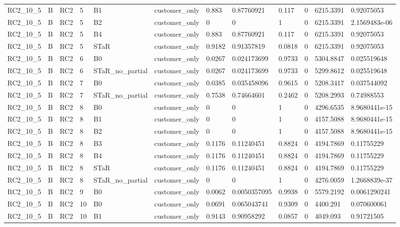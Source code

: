 \begin{longtable}{llllllllllll}
RC2\_10\_5 & B & RC2 & 5 & B1 & customer\_only & 0.883 & 0.87760921 & 0.117 & 0 & 6215.3391 & 0.92075053 \\
RC2\_10\_5 & B & RC2 & 5 & B2 & customer\_only & 0 & 0 & 1 & 0 & 6215.3391 & 2.1569483e-06 \\
RC2\_10\_5 & B & RC2 & 5 & B4 & customer\_only & 0.883 & 0.87760921 & 0.117 & 0 & 6215.3391 & 0.92075053 \\
RC2\_10\_5 & B & RC2 & 5 & STaR & customer\_only & 0.9182 & 0.91357819 & 0.0818 & 0 & 6215.3391 & 0.92075053 \\
RC2\_10\_5 & B & RC2 & 6 & B0 & customer\_only & 0.0267 & 0.024173699 & 0.9733 & 0 & 5304.8847 & 0.025519648 \\
RC2\_10\_5 & B & RC2 & 6 & STaR\_no\_partial & customer\_only & 0.0267 & 0.024173699 & 0.9733 & 0 & 5299.8612 & 0.025519648 \\
RC2\_10\_5 & B & RC2 & 7 & B0 & customer\_only & 0.0385 & 0.035458096 & 0.9615 & 0 & 5208.3417 & 0.037544092 \\
RC2\_10\_5 & B & RC2 & 7 & STaR\_no\_partial & customer\_only & 0.7538 & 0.74664601 & 0.2462 & 0 & 5208.2993 & 0.74988553 \\
RC2\_10\_5 & B & RC2 & 8 & B0 & customer\_only & 0 & 0 & 1 & 0 & 4296.6535 & 8.9680441e-15 \\
RC2\_10\_5 & B & RC2 & 8 & B1 & customer\_only & 0 & 0 & 1 & 0 & 4157.5088 & 8.9680441e-15 \\
RC2\_10\_5 & B & RC2 & 8 & B2 & customer\_only & 0 & 0 & 1 & 0 & 4157.5088 & 8.9680441e-15 \\
RC2\_10\_5 & B & RC2 & 8 & B3 & customer\_only & 0.1176 & 0.11240451 & 0.8824 & 0 & 4194.7869 & 0.11755229 \\
RC2\_10\_5 & B & RC2 & 8 & B4 & customer\_only & 0.1176 & 0.11240451 & 0.8824 & 0 & 4194.7869 & 0.11755229 \\
RC2\_10\_5 & B & RC2 & 8 & STaR & customer\_only & 0.1176 & 0.11240451 & 0.8824 & 0 & 4194.7869 & 0.11755229 \\
RC2\_10\_5 & B & RC2 & 8 & STaR\_no\_partial & customer\_only & 0 & 0 & 1 & 0 & 4276.0059 & 1.2668839e-37 \\
RC2\_10\_5 & B & RC2 & 9 & B0 & customer\_only & 0.0062 & 0.0050357095 & 0.9938 & 0 & 5579.2192 & 0.0061290241 \\
RC2\_10\_5 & B & RC2 & 10 & B0 & customer\_only & 0.0691 & 0.065043741 & 0.9309 & 0 & 4400.291 & 0.070600061 \\
RC2\_10\_5 & B & RC2 & 10 & B1 & customer\_only & 0.9143 & 0.90958292 & 0.0857 & 0 & 4049.093 & 0.91721505 \\

\end{longtable}
